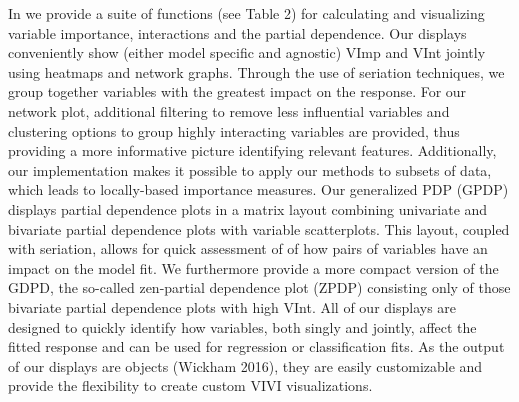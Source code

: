 In  we provide a suite of functions (see Table 2) for calculating and visualizing variable importance, interactions and the partial dependence. Our displays conveniently show (either model specific and agnostic) VImp and VInt jointly using heatmaps and network graphs. Through the use of seriation techniques, we group together variables with the greatest impact on the response. For our network plot, additional filtering to remove less influential variables and clustering options to group highly interacting variables are provided, thus providing a more informative picture identifying relevant features. Additionally, our implementation makes it possible to apply our methods to subsets of data, which leads to locally-based importance measures. Our generalized PDP (GPDP) displays partial dependence plots in a matrix layout combining univariate and bivariate partial dependence plots with variable scatterplots. This layout, coupled with seriation, allows for quick assessment of of how pairs of variables have an impact on the model fit. We furthermore provide a more compact version of the GDPD, the so-called zen-partial dependence plot (ZPDP) consisting only of those bivariate partial dependence plots with high VInt. All of our displays are designed to quickly identify how variables, both singly and jointly, affect the fitted response and can be used for regression or classification fits. As the output of our displays are  objects (Wickham 2016), they are easily customizable and provide the flexibility to create custom VIVI visualizations.

